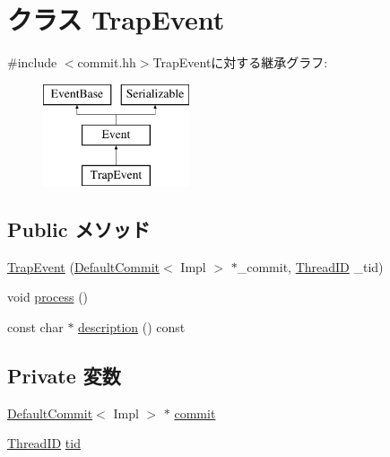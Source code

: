 \hypertarget{classDefaultCommit_1_1TrapEvent}{
\section{クラス TrapEvent}
\label{classDefaultCommit_1_1TrapEvent}
}


{\ttfamily \#include $<$commit.hh$>$}TrapEventに対する継承グラフ:\begin{figure}[H]
\begin{center}
\leavevmode
\includegraphics[height=3cm]{classDefaultCommit_1_1TrapEvent}
\end{center}
\end{figure}
\subsection*{Public メソッド}
\begin{DoxyCompactItemize}
\item 
\hyperlink{classDefaultCommit_1_1TrapEvent_aac9789c38c08cd80f1a477b319c3ca6e}{TrapEvent} (\hyperlink{classDefaultCommit}{DefaultCommit}$<$ Impl $>$ $\ast$\_\-commit, \hyperlink{base_2types_8hh_ab39b1a4f9dad884694c7a74ed69e6a6b}{ThreadID} \_\-tid)
\item 
void \hyperlink{classDefaultCommit_1_1TrapEvent_a2e9c5136d19b1a95fc427e0852deab5c}{process} ()
\item 
const char $\ast$ \hyperlink{classDefaultCommit_1_1TrapEvent_a5a14fe478e2393ff51f02e9b7be27e00}{description} () const 
\end{DoxyCompactItemize}
\subsection*{Private 変数}
\begin{DoxyCompactItemize}
\item 
\hyperlink{classDefaultCommit}{DefaultCommit}$<$ Impl $>$ $\ast$ \hyperlink{classDefaultCommit_1_1TrapEvent_a9a5f97f5a2b65d6ebf11addf277241aa}{commit}
\item 
\hyperlink{base_2types_8hh_ab39b1a4f9dad884694c7a74ed69e6a6b}{ThreadID} \hyperlink{classDefaultCommit_1_1TrapEvent_aa508770268ee4ceaf16054b9e0be0e17}{tid}
\end{DoxyCompactItemize}


